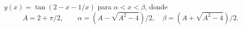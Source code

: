 $y(x)=\tan(2-x-1/x)$ para $\alpha<x<\beta$, donde
\[A=2+\pi/2,\qquad \alpha=(A-\sqrt{A^2-4})/2,\quad\beta=(A+\sqrt{A^2-4})/2.\]
